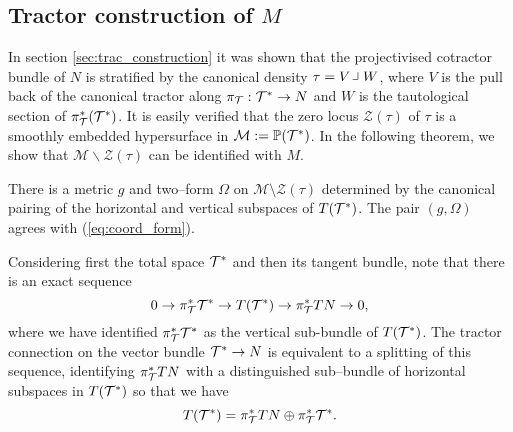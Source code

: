 \subsection{Tractor construction of $M$}

In section \ref{sec:trac_construction} it was shown that the projectivised cotractor bundle of $N$ is stratified by the canonical density $\tau=V\hook W$, where $V$ is the pull back of the canonical tractor along $\pi_{\mathcal{T}}:\mathcal{T}^*\rightarrow N$ and $W$ is the tautological section of $\pi_{\mathcal{T}}^*(\mathcal{T}^*)$. It is easily verified that the zero locus $\mathcal{Z}(\tau)$ of $\tau$ is a smoothly embedded hypersurface in $\mathcal{M}:=\mathbb{P}(\mathcal{T}^*)$. %
In the following theorem, we show that $\mathcal{M}\backslash\mathcal{Z}(\tau)$ can be identified with $M$.

\begin{theo}\cite{DGW}\label{metric} 
There is a metric $g$ and two--form $\Omega$ on $\mathcal{M}\setminus \mathcal{Z}(\tau)$ determined by the canonical pairing of the horizontal and vertical subspaces of $T(\mathcal{T}^*)$. The pair $(g,\Omega)$ agrees with (\ref{eq:coord_form}).
\end{theo}
 Considering first the total space $\mathcal{T}^*$ and then its tangent
 bundle, note that there is an exact sequence
  \begin{equation}\label{TM}
0\to \pi_{\mathcal{T}}^* \mathcal{T}^*\to T(\mathcal{T}^*)\to \pi_{\mathcal{T}}^*TN\to 0,
  \end{equation}
  where we have identified $\pi_{\mathcal{T}}^* \mathcal{T}^*$ as the vertical sub-bundle of $T(\mathcal{T}^*)$.
The tractor connection on the vector bundle $\mathcal{T}^*\to N$ is equivalent to a splitting of this sequence, identifying $\pi_{\mathcal{T}}^*TN$ with a distinguished  sub--bundle of horizontal subspaces in 
$ T(\mathcal{T}^*)$ so that we have 
\begin{equation}\label{HV}
T(\mathcal{T}^*)=  \pi_{\mathcal{T}}^*TN\oplus \pi_{\mathcal{T}}^* \mathcal{T}^* .
\end{equation}


